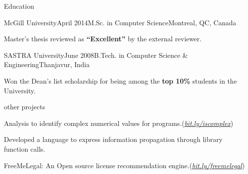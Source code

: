 \documentclass{resume} %
\begin{document}
 
\begin{rSection}{Education}

\begin{rSubsection}{McGill University}{April 2014}{M.Sc. in
Computer Science}{Montreal, QC, Canada} 
\item Master's thesis reviewed as \textbf{``Excellent''} by the external
reviewer.
\end{rSubsection}

\begin{rSubsection}{SASTRA University}{June 2008}{B.Tech. in Computer Science
\& Engineering}{Thanjavur, India} 
\item Won the {Dean's list scholarship} for being among the \textbf{top
10\%} students in the University. 
\end{rSubsection}

\end{rSection}

\begin{rSection}{other projects}\smallskip \begin{lSubsection}
%
\item Analysis to identify complex numerical values for \matlab
        programs.(\href{http://bit.ly/iscomplex}{\em{bit.ly/iscomplex}}) 
\begin{lsubSubsection}
\item Developed a language to express information propagation through library
function calls.%
\end{lsubSubsection}

\item FreeMeLegal: An Open source license recommendation
engine.(\href{http://bit.ly/freemelegal}{\em{bit.ly/freemelegal}}) 
\end{lSubsection}
\end{rSection}

\end{document}

